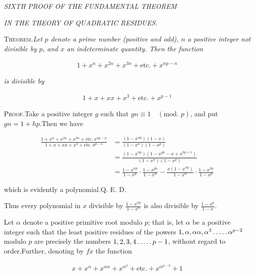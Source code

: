 \begin{center}
\textit{SIXTH PROOF OF THE FUNDAMENTAL THEOREM}\par
\textit{IN THE THEORY OF QUADRATIC RESIDUES.}
\end{center}


\textsc{Theorem.}\quad \textit{Let $p$ denote a prime number (positive and odd), $n$ a positive integer not divisible by $p$, and $x$ an indeterminate quantity. Then the function}

\[
\begin{aligned}
1+x^n+x^{2n}+x^{3n}+\text{etc.}+x^{np-n}
\end{aligned}
\]

\textit{is divisible by}

\[
\begin{aligned}
1+x+xx+x^3+\text{etc.}+x^{p-1}
\end{aligned}
\]

\textsc{Proof.}\quad Take a positive integer $g$ such that $gn\equiv1\quad(\text{mod. }p)$, and put $gn=1+hp$.\quad Then we have

{\small
\[
\begin{aligned}
\frac{1+x^n+x^{2n}+x^{3n}+\text{etc.}\,x^{np-n}}{1+x+xx+x^3+\text{etc.}\,x^{p-1}} &=\frac{(1-x^{np})(1-x)}{(1-x^n)(1-x^p)}\\&=\frac{(1-x^{np})(1-x^{gn}-x+x^{hp+1})}{(1-x^n)(1-x^p)}\\
&=\frac{1-x^{np}}{1-x^p}\cdot\frac{1-x^{gn}}{1-x^n}-\frac{x(1-x^{np})}{1-x^n}\cdot\frac{1-x^{hp}}{1-x^p}
\end{aligned}
\]
}

which is evidently a polynomial.\quad Q. E. D.

Thus every polynomial in $x$ divisible by $\frac{1-x^{np}}{1-x^n}$ is also divisible by $\frac{1-x^p}{1-x}$.


Let $\alpha$ denote a positive primitive root modulo $p$; that is, let $\alpha$ be a positive integer such that the least positive residues of the powers $1,\alpha,\alpha\alpha,\alpha^3\mathinner{.\,.\,.\,.\,.}\alpha^{p-2}$ modulo $p$ are precisely the numbers $1,2,3,4\mathinner{.\,.\,.\,.\,.} p-1$, without regard to order.\quad Further, denoting by $fx$ the function

\[
\begin{aligned}
x+x^\alpha+x^{\alpha\alpha}+x^{\alpha^3}+\text{etc.}+x^{\alpha^{p-2}}+1
\end{aligned}
\]

